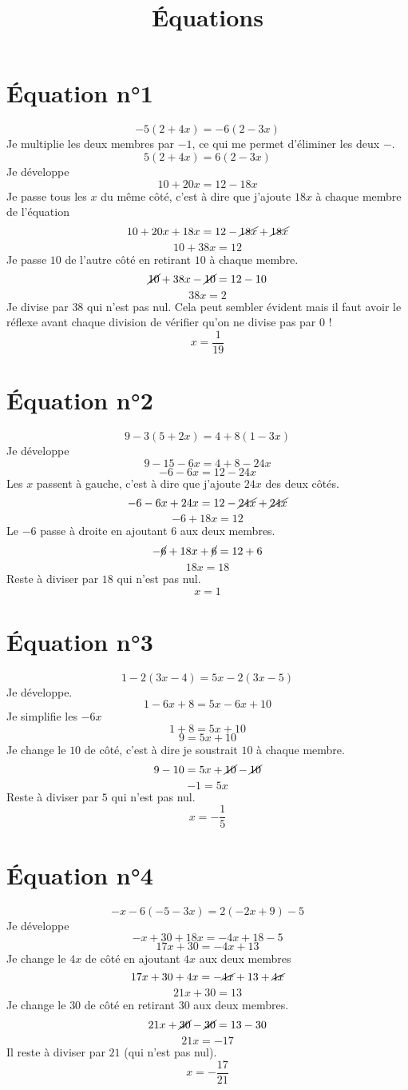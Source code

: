 \documentclass[a4paper,10pt]{article}
\title{Équations}
\author{\eDevoir}
\begin{document}
\maketitle
\section{Équation n°1}

$$ -5(2+4x)=-6(2-3x)$$
Je multiplie les deux membres par $-1$, ce qui me permet d'éliminer les deux $-$.
$$ 5(2+4x)=6(2-3x)$$
Je développe
$$ 10+20x=12-18x $$
Je passe tous les $x$ du même côté, c'est à dire que j'ajoute $18x$ à chaque membre de l'équation
$$ 10+20x+18x=12-\cancel{18x}+\cancel{18x}$$
$$ 10+38x=12$$
Je passe $10$ de l'autre côté en retirant $10$ à chaque membre.
$$ \cancel{10}+38x-\cancel{10}=12-10$$
$$ 38x=2$$
Je divise par $38$ qui n'est pas nul. Cela peut sembler évident mais il faut avoir le réflexe avant chaque division de vérifier qu'on ne divise pas par $0$ !
$$ \boxed{x=\frac{1}{19}}$$

\section{Équation n°2}
$$9-3(5+2x)=4+8(1-3x)$$
Je développe
$$9-15-6x=4+8-24x$$
$$-6-6x=12-24x$$
Les $x$ passent à gauche, c'est à dire que j'ajoute $24x$ des deux côtés.
$$-6-6x+24x=12-\cancel{24x}+\cancel{24x}$$
$$-6+18x=12$$
Le $-6$ passe à droite en ajoutant $6$ aux deux membres.
$$-\cancel{6}+18x+\cancel{6}=12+6$$
$$18x=18$$
Reste à diviser par $18$ qui n'est pas nul.
$$\boxed{x=1}$$

\section{Équation n°3}
$$1-2(3x-4)=5x-2(3x-5)$$
Je développe.
$$1-6x+8=5x-6x+10$$
Je simplifie les $-6x$
$$1+8=5x+10$$
$$9=5x+10$$
Je change le $10$ de côté, c'est à dire je soustrait $10$ à chaque membre.
$$9-10=5x+\cancel{10}-\cancel{10}$$
$$-1=5x$$
Reste à diviser par $5$ qui n'est pas nul.
$$\boxed{x=-\frac{1}{5}}$$

\section{Équation n°4}
$$-x-6(-5-3x)=2(-2x+9)-5$$
Je développe
$$-x+30+18x=-4x+18-5$$
$$17x+30=-4x+13$$
Je change le $4x$ de côté en ajoutant $4x$ aux deux membres
$$17x+30+4x=-\cancel{4x}+13+\cancel{4x}$$
$$21x+30=13$$
Je change le $30$ de côté en retirant $30$ aux deux membres.
$$21x+\cancel{30}-\cancel{30}=13-30$$
$$21x=-17$$
Il reste à diviser par $21$ (qui n'est pas nul).
$$\boxed{x=-\frac{17}{21}}$$
\end{document}
